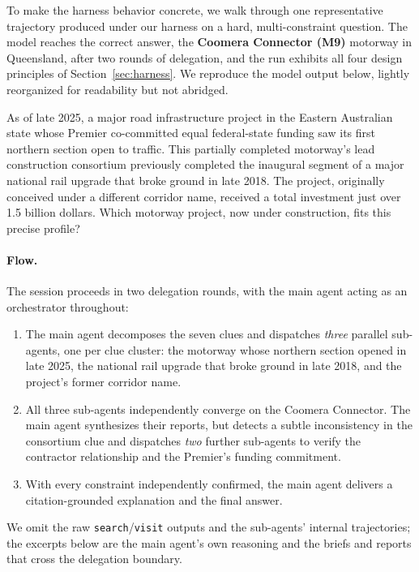 \documentclass{llmxive}
\begin{document}
To make the harness behavior concrete, we walk through one representative trajectory produced under our harness on a hard, multi-constraint question. The model reaches the correct answer, the \textbf{Coomera Connector (M9)} motorway in Queensland, after two rounds of delegation, and the run exhibits all four design principles of Section~\ref{sec:harness}. We reproduce the model output below, lightly reorganized for readability but not abridged.

\begin{tcolorbox}[breakable,enhanced jigsaw,colback=blue!4,colframe=blue!55,boxrule=0.4pt,left=5pt,right=5pt,top=3pt,bottom=3pt,fonttitle=\bfseries\sffamily\small,coltitle=black,fontupper=\small,title={User question}]
As of late 2025, a major road infrastructure project in the Eastern Australian state whose Premier co-committed equal federal-state funding saw its first northern section open to traffic. This partially completed motorway's lead construction consortium previously completed the inaugural segment of a major national rail upgrade that broke ground in late 2018. The project, originally conceived under a different corridor name, received a total investment just over 1.5 billion dollars. Which motorway project, now under construction, fits this precise profile?
\end{tcolorbox}

\paragraph{Flow.} The session proceeds in two delegation rounds, with the main agent acting as an orchestrator throughout:
\begin{enumerate}[leftmargin=1.4em,topsep=2pt,itemsep=2pt]
\item The main agent decomposes the seven clues and dispatches \emph{three} parallel sub-agents, one per clue cluster: the motorway whose northern section opened in late 2025, the national rail upgrade that broke ground in late 2018, and the project's former corridor name.
\item All three sub-agents independently converge on the Coomera Connector. The main agent synthesizes their reports, but detects a subtle inconsistency in the consortium clue and dispatches \emph{two} further sub-agents to verify the contractor relationship and the Premier's funding commitment.
\item With every constraint independently confirmed, the main agent delivers a citation-grounded explanation and the final answer.
\end{enumerate}
We omit the raw \texttt{search}/\texttt{visit} outputs and the sub-agents' internal trajectories; the excerpts below are the main agent's own reasoning and the briefs and reports that cross the delegation boundary.
\end{document}
